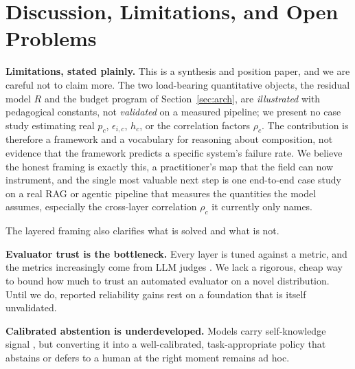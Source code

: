 \documentclass[11pt]{article}
\begin{document}
\section{Discussion, Limitations, and Open Problems}
\label{sec:discussion}

\textbf{Limitations, stated plainly.} This is a synthesis and position paper, and
we are careful not to claim more. The two load-bearing quantitative objects, the
residual model $R$ and the budget program of Section~\ref{sec:arch}, are
\emph{illustrated} with pedagogical constants, not \emph{validated} on a measured
pipeline; we present no case study estimating real $p_c$, $\epsilon_{i,c}$, $h_c$,
or the correlation factors $\rho_c$. The contribution is therefore a framework and
a vocabulary for reasoning about composition, not evidence that the framework
predicts a specific system's failure rate. We believe the honest framing is
exactly this, a practitioner's map that the field can now instrument, and the
single most valuable next step is one end-to-end case study on a real RAG or
agentic pipeline that measures the quantities the model assumes, especially the
cross-layer correlation $\rho_c$ it currently only names.

The layered framing also clarifies what is solved and what is not.

\textbf{Evaluator trust is the bottleneck.} Every layer is tuned against a
metric, and the metrics increasingly come from LLM judges
\citep{zheng2023mtbench,es2023ragas}. We lack a rigorous, cheap way to bound how
much to trust an automated evaluator on a novel distribution. Until we do,
reported reliability gains rest on a foundation that is itself unvalidated.

\textbf{Calibrated abstention is underdeveloped.} Models carry self-knowledge
signal \citep{kadavath2022know}, but converting it into a well-calibrated,
task-appropriate policy that abstains or defers to a human at the right moment
remains ad hoc.
\end{document}
